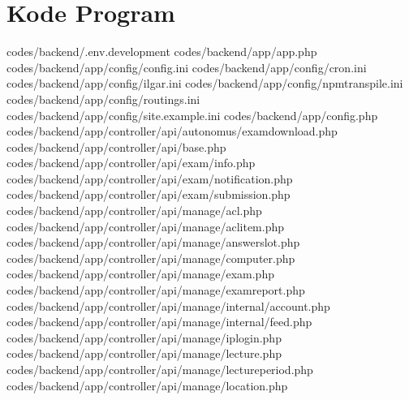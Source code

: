 \chapter{Kode Program}
\label{lamp:B}
codes/backend/.env.development
codes/backend/app/app.php
codes/backend/app/config/config.ini
codes/backend/app/config/cron.ini
codes/backend/app/config/ilgar.ini
codes/backend/app/config/npmtranspile.ini
codes/backend/app/config/routings.ini
codes/backend/app/config/site.example.ini
codes/backend/app/config.php
codes/backend/app/controller/api/autonomus/examdownload.php
codes/backend/app/controller/api/base.php
codes/backend/app/controller/api/exam/info.php
codes/backend/app/controller/api/exam/notification.php
codes/backend/app/controller/api/exam/submission.php
codes/backend/app/controller/api/manage/acl.php
codes/backend/app/controller/api/manage/aclitem.php
codes/backend/app/controller/api/manage/answerslot.php
codes/backend/app/controller/api/manage/computer.php
codes/backend/app/controller/api/manage/exam.php
codes/backend/app/controller/api/manage/examreport.php
codes/backend/app/controller/api/manage/internal/account.php
codes/backend/app/controller/api/manage/internal/feed.php
codes/backend/app/controller/api/manage/iplogin.php
codes/backend/app/controller/api/manage/lecture.php
codes/backend/app/controller/api/manage/lectureperiod.php
codes/backend/app/controller/api/manage/location.php
